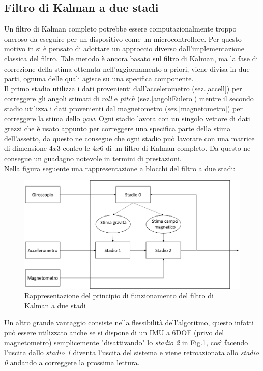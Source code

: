 \subsection{Filtro di Kalman a due stadi}
Un filtro di Kalman completo potrebbe essere computazionalmente troppo oneroso da eseguire per un dispositivo come un microcontrollore. Per questo motivo in \cite{trackingThesis} si è pensato di adottare un approccio diverso dall'implementazione classica del filtro. Tale metodo è ancora basato sul filtro di Kalman, ma la fase di correzione della stima ottenuta nell'aggiornamento a priori, viene divisa in due parti, ognuna delle quali agisce su una specifica componente.\\
Il primo stadio utilizza i dati provenienti dall'accelerometro (sez.\ref{accell}) per correggere gli angoli stimati di \textit{roll} e \textit{pitch} (sez.\ref{angoliEulero}) mentre il secondo stadio utilizza i dati provenienti dal magnetometro (sez.\ref{magnetometro}) per correggere la stima dello \textit{yaw}. Ogni stadio lavora con un singolo vettore di dati grezzi che è usato appunto per correggere una specifica parte della stima dell'assetto, da questo ne consegue che ogni stadio può lavorare con una matrice di dimensione $ 4 x 3$ contro le $ 4 x 6$ di un filtro di Kalman completo. Da questo ne consegue un guadagno notevole in termini di prestazioni.\\
 Nella figura seguente una rappresentazione a blocchi del filtro a due stadi:
\begin{figure}[H]  
	\centering 
	\includegraphics[scale=0.3]{elaborazione/filtro.png}
	\caption{Rappresentazione del principio di funzionamento del filtro di Kalman a due stadi \cite{trackingThesis}}
	\label{fig:filtro}
\end{figure}

Un altro grande vantaggio consiste nella flessibilità dell'algoritmo, questo infatti può essere utilizzato anche se si dispone di un IMU a 6DOF (privo del magnetometro) semplicemente "disattivando" lo \textit{stadio 2} in Fig.\ref{fig:filtro}, così facendo l'uscita dallo \textit{stadio 1} diventa l'uscita del sistema e viene retroazionata allo \textit{stadio 0} andando a correggere la prossima lettura.
 
